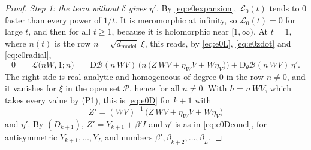 \documentclass[10pt]{article}
\theoremstyle{definition}
\theoremstyle{remark}
\newcommand{\dm}{d_{\mathrm{model}}}
\newcommand{\Der}{\mathrm{D}}
\begin{document}
\begin{proof}
\emph{Step 1: the term without $\delta$ gives $\eta'$.} By \eqref{eq:e0expansion}, $\mathcal L_0(t)$ tends to $0$ faster than every power of $1/t$. It is meromorphic at infinity, so $\mathcal L_0(t) = 0$ for large $t$, and then for all $t \ge 1$, because it is holomorphic near $[1, \infty)$. At $t = 1$, where $n(t)$ is the row $n = \sqrt{\dm}\;\xi$, this reads, by \eqref{eq:e0L}, \eqref{eq:e0zdot} and \eqref{eq:e0radial},
\[
0 \;=\; \mathcal L\big(nW, 1; n\big) \;=\; \Der\mathcal B(n\,WV)\,\Big(n\,\big(Z\,WV + \eta_WV + W\eta_V\big)\Big) + \Der_\theta\mathcal B(n\,WV)\,\eta' .
\]
The right side is real-analytic and homogeneous of degree $0$ in the row $n \neq 0$, and it vanishes for $\xi$ in the open set $\mathcal P$, hence for all $n \neq 0$. With $h = n\,WV$, which takes every value by (P1), this is \eqref{eq:e0D} for $k+1$ with
\begin{equation}\label{eq:e0Zprime}
Z' = (WV)^{-1}\,\big(Z\,WV + \eta_WV + W\eta_V\big)
\end{equation}
and $\eta'$. By $(D_{k+1})$, $Z' = Y_{k+1} + \beta' I$ and $\eta'$ is as in \eqref{eq:e0Dconcl}, for antisymmetric $Y_{k+1}, \dots, Y_L$ and numbers $\beta', \beta_{k+2}, \dots, \beta_L$.


\end{proof}
\end{document}
